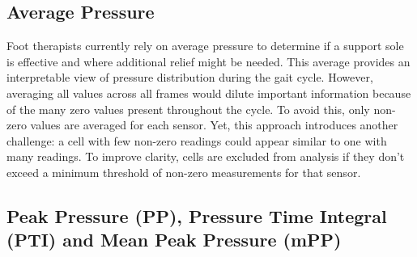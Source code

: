 



\subsection{Average Pressure}
\label{ssec:average_pressure}

Foot therapists currently rely on average pressure to determine if a support sole is effective and where additional relief might be needed. This average provides an interpretable view 
of pressure distribution during the gait cycle. However, averaging all values across all frames would dilute important information because of the many zero values present throughout 
the cycle. To avoid this, only non-zero values are averaged for each sensor. Yet, this approach introduces another challenge: a cell with few non-zero readings could appear similar to 
one with many readings. To improve clarity, cells are excluded from analysis if they don't exceed a minimum threshold of non-zero measurements for that sensor\cite{masterInsole}.


\subsection{Peak Pressure (PP), Pressure Time Integral (PTI) and Mean Peak Pressure (mPP)}
\label{ssec:pp_pti_mPP}

